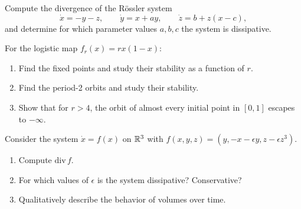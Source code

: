 \begin{exercise}
Compute the divergence of the R\"ossler system
\[
    \dot{x} = -y - z, \qquad \dot{y} = x + ay, \qquad \dot{z} = b + z(x - c),
\]
and determine for which parameter values $a, b, c$ the system is dissipative.
\end{exercise}

\begin{exercise}
For the logistic map $f_r(x) = rx(1-x)$:
\begin{enumerate}
    \item Find the fixed points and study their stability as a function of $r$.
    \item Find the period-2 orbits and study their stability.
    \item Show that for $r > 4$, the orbit of almost every initial point in
    $[0,1]$ escapes to $-\infty$.
\end{enumerate}
\end{exercise}

\begin{exercise}
Consider the system $\dot{x} = f(x)$ on $\mathbb{R}^3$ with
$f(x,y,z) = (y, -x - \epsilon y, z - \epsilon z^3)$.
\begin{enumerate}
    \item Compute $\mathrm{div}\, f$.
    \item For which values of $\epsilon$ is the system dissipative?
    Conservative?
    \item Qualitatively describe the behavior of volumes over time.
\end{enumerate}
\end{exercise}
